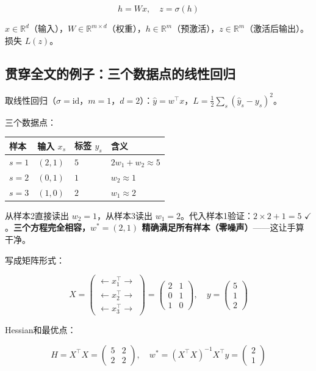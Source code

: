 \documentclass[12pt,a4paper]{article}
\begin{document}
\[h = Wx, \quad z = \sigma(h)\]

$x \in \mathbb{R}^d$（输入），$W \in \mathbb{R}^{m \times d}$（权重），$h \in \mathbb{R}^m$（预激活），$z \in \mathbb{R}^m$（激活后输出）。损失 $L(z)$。


\subsection{贯穿全文的例子：三个数据点的线性回归}
 
取线性回归（$\sigma = \text{id}$，$m = 1$，$d = 2$）：$\hat{y} = w^\top x$，$L = \frac{1}{2}\sum_s(\hat{y}_s - y_s)^2$。
 
三个数据点：
 
\begin{center}\small
\begin{longtable}{|l|l|l|l|}
\hline
样本 & 输入 $x_s$ & 标签 $y_s$ & 含义 \\
\hline
$s=1$ & $(2, 1)$ & $5$ & $2w_1 + w_2 \approx 5$ \\
$s=2$ & $(0, 1)$ & $1$ & $w_2 \approx 1$ \\
$s=3$ & $(1, 0)$ & $2$ & $w_1 \approx 2$ \\
\hline
\end{longtable}
\end{center}
 
从样本2直接读出 $w_2 = 1$，从样本3读出 $w_1 = 2$。代入样本1验证：$2 \times 2 + 1 = 5$ $\checkmark$。\textbf{三个方程完全相容，$w^* = (2, 1)$ 精确满足所有样本（零噪声）}——这让手算干净。
 
写成矩阵形式：
 
\[X = \begin{pmatrix} \leftarrow x_1^\top \rightarrow \\ \leftarrow x_2^\top \rightarrow \\ \leftarrow x_3^\top \rightarrow \end{pmatrix} = \begin{pmatrix}2&1\\0&1\\1&0\end{pmatrix}, \quad y = \begin{pmatrix}5\\1\\2\end{pmatrix}\]
 
Hessian和最优点：
 
\[H = X^\top X = \begin{pmatrix}5&2\\2&2\end{pmatrix}, \quad w^* = (X^\top X)^{-1}X^\top y = \begin{pmatrix}2\\1\end{pmatrix}\]
 
\end{document}
